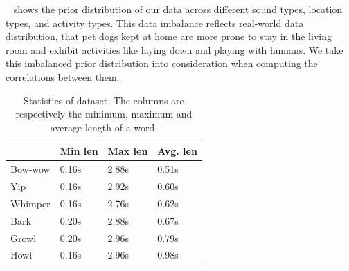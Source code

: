 ~ shows the prior distribution of our data across different sound types, location types, and activity types. This data imbalance reflects real-world data distribution, that pet dogs kept at home are more prone to stay in the living room and exhibit activities like laying down and playing with humans.
We take this imbalanced prior distribution into consideration when computing the correlations between them. 

\begin{table}[th]
	\small
	\centering
	\begin{tabular}{p{}|p{}|p{}|p{}}
		\toprule
		& Min len & Max len & Avg. len \\ \midrule
		Bow-wow & 0.16s & 2.88s & 0.51s  \\ \midrule
		Yip & 0.16s & 2.92s & 0.60s\\ \midrule
		Whimper & 0.16s & 2.76s & 0.62s\\ \midrule
		Bark & 0.20s & 2.88s& 0.67s \\ \midrule
		Growl & 0.20s & 2.96s & 0.79s\\ \midrule
		Howl & 0.16s & 2.96s & 0.98s\\
		\bottomrule
	\end{tabular}
	\caption{Statistics of dataset. The columns are respectively the minimum, maximum and average length of a word.}
	\label{tab:datainformation1}
\end{table}








